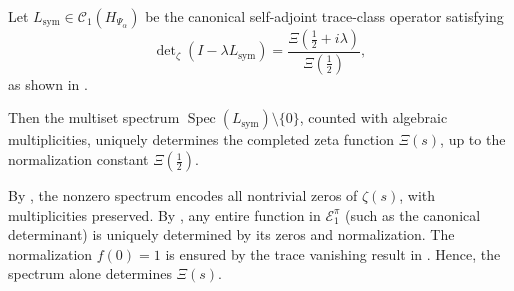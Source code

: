 \begin{corollary}
\label{cor:spectrum_determines_zeta}
Let \( L_{\mathrm{sym}} \in \mathcal{C}_1(H_{\Psi_\alpha}) \) be the canonical self-adjoint trace-class operator satisfying
\[
\det\nolimits_\zeta(I - \lambda L_{\mathrm{sym}}) = \frac{\Xi(\tfrac{1}{2} + i\lambda)}{\Xi(\tfrac{1}{2})},
\]
as shown in .

Then the multiset spectrum \( \operatorname{Spec}(L_{\mathrm{sym}}) \setminus \{0\} \), counted with algebraic multiplicities, uniquely determines the completed zeta function \( \Xi(s) \), up to the normalization constant \( \Xi(\tfrac{1}{2}) \).

\medskip
\noindent
By , the nonzero spectrum encodes all nontrivial zeros of \( \zeta(s) \), with multiplicities preserved. By , any entire function in \( \mathcal{E}_1^\pi \) (such as the canonical determinant) is uniquely determined by its zeros and normalization. The normalization \( f(0) = 1 \) is ensured by the trace vanishing result in . Hence, the spectrum alone determines \( \Xi(s) \).
\end{corollary}
